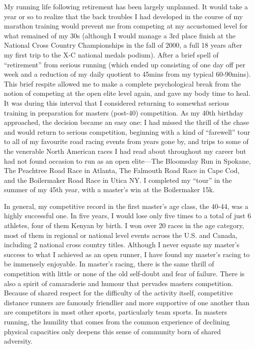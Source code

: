 My running life following retirement has been largely unplanned. It would take a year or so to realize that the back troubles I had developed in the course of my marathon training would prevent me from competing at my accustomed level for what remained of my 30s (although I would manage a 3rd place finish at the National Cross Country Championships in the fall of 2000, a full 18 years after my first trip to the X-C national medals podium). After a brief spell of “retirement” from serious running (which ended up consisting of one day off per week and a reduction of my daily quotient to 45mins from my typical 60-90mins). This brief respite allowed me to make a complete psychological break from the notion of competing at the open elite level again, and gave my body time to heal. It was during this interval that I considered returning to somewhat serious training in preparation for masters (post-40) competition. As my 40th birthday approached, the decision became an easy one: I had missed the thrill of the chase and would return to serious competition, beginning with a kind of “farewell” tour to all of my favourite road racing events from years gone by, and trips to some of the venerable North American races I had read about throughout my career but had not found occasion to run as an open elite—The Bloomsday Run in Spokane, The Peachtree Road Race in Atlanta, The Falmouth Road Race in Cape Cod, and the Boilermaker Road Race in Utica NY. I completed my “tour” in the summer of my 45th year, with a master’s win at the Boilermaker 15k.


In general, my competitive record in the first master’s age class, the 40-44, was a highly successful one. In five years, I would lose only five times to a total of just 6 athletes, four of them Kenyan by birth. I won over 20 races in the age category, most of them in regional or national level events across the U.S. and Canada, including 2 national cross country titles. Although I never equate my master’s success to what I achieved as an open runner, I have found my master’s racing to be immensely enjoyable. In master’s racing, there is the same thrill of competition with little or none of the old self-doubt and fear of failure. There is also a spirit of camaraderie and humour that pervades masters competition. Because of shared respect for the difficulty of the activity itself, competitive distance runners are famously friendlier and more supportive of one another than are competitors in most other sports, particularly team sports. In masters running, the humility that comes from the common experience of declining physical capacities only deepens this sense of community born of shared adversity.


